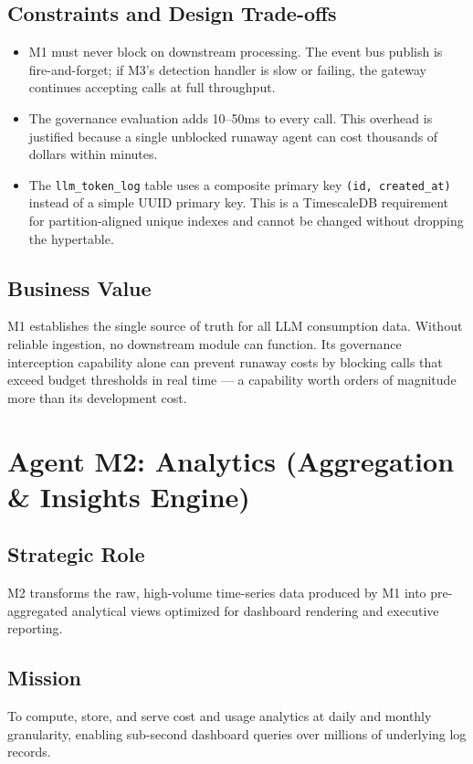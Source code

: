 \documentclass[12pt,a4paper,twoside]{report}
\begin{document}
\subsection{Constraints and Design Trade-offs}
\begin{itemize}
  \item M1 must never block on downstream processing. The event bus publish is fire-and-forget; if M3's detection handler is slow or failing, the gateway continues accepting calls at full throughput.
  \item The governance evaluation adds 10--50ms to every call. This overhead is justified because a single unblocked runaway agent can cost thousands of dollars within minutes.
  \item The \texttt{llm\_token\_log} table uses a composite primary key \texttt{(id, created\_at)} instead of a simple UUID primary key. This is a TimescaleDB requirement for partition-aligned unique indexes and cannot be changed without dropping the hypertable.
\end{itemize}

\subsection{Business Value}
M1 establishes the single source of truth for all LLM consumption data. Without reliable ingestion, no downstream module can function. Its governance interception capability alone can prevent runaway costs by blocking calls that exceed budget thresholds in real time — a capability worth orders of magnitude more than its development cost.

\section{Agent M2: Analytics (Aggregation \& Insights Engine)}

\subsection{Strategic Role}
M2 transforms the raw, high-volume time-series data produced by M1 into pre-aggregated analytical views optimized for dashboard rendering and executive reporting.

\subsection{Mission}
To compute, store, and serve cost and usage analytics at daily and monthly granularity, enabling sub-second dashboard queries over millions of underlying log records.
\end{document}
